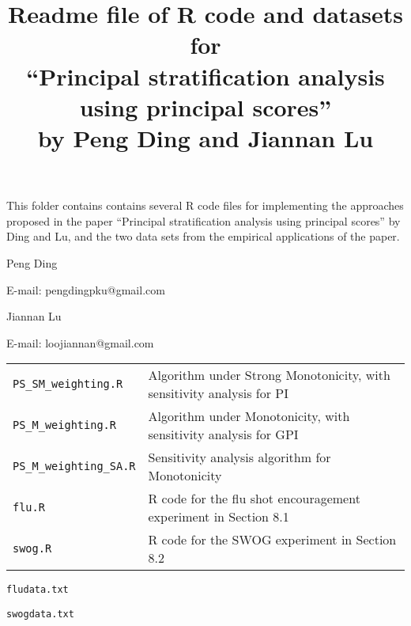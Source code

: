 \documentclass[11pt]{article}
\theoremstyle{definition}
\begin{document}
\doublespacing

\title{\bf Readme file of R code and datasets for\\
``Principal stratification analysis using principal scores''\\
by Peng Ding and Jiannan Lu}
\date{}
\maketitle







This folder contains contains several R code files for implementing the approaches proposed in the paper ``Principal stratification analysis using principal scores'' by Ding and Lu, and the two data sets from the empirical applications of the paper.  

\vspace{4mm}



Peng Ding


E-mail: pengdingpku@gmail.com

\vspace{2mm}

Jiannan Lu


E-mail: loojiannan@gmail.com


\vspace{4mm}





\begin{tabular}{ll}
\texttt{PS\_SM\_weighting.R} & Algorithm under Strong Monotonicity, with sensitivity analysis for PI\\
\texttt{PS\_M\_weighting.R} & Algorithm under Monotonicity, with sensitivity analysis for GPI\\
\texttt{PS\_M\_weighting\_SA.R} & Sensitivity analysis algorithm for Monotonicity\\
\texttt{flu.R} & R code for the flu shot encouragement experiment in Section 8.1\\
\texttt{swog.R} & R code for the SWOG experiment in Section 8.2
\end{tabular}



\vspace{4mm}


\texttt{fludata.txt}

\texttt{swogdata.txt}
\end{document}
